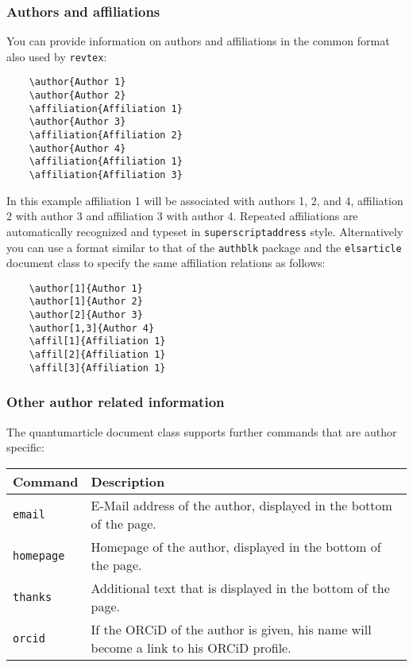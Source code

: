 \documentclass[a4paper,noarxiv,onecolumn]{quantumarticle}
\newenvironment{commands}
{\medskip\noindent\begin{longtable}{p{.20\columnwidth}p{.744\columnwidth}}
		\textsf{Command} & \textsf{Description} \\
		\midrule
	}
	{\bottomrule\end{longtable}}
\newcommand{\command}[2]{
	\small\texttt{#1} & {\small#2} \\
}
\begin{document}
	\subsubsection{Authors and affiliations}
	You can provide information on authors and affiliations in the common format also used by \texttt{revtex}:
	\begin{verbatim}
	\author{Author 1}
	\author{Author 2}
	\affiliation{Affiliation 1}
	\author{Author 3}
	\affiliation{Affiliation 2}
	\author{Author 4}
	\affiliation{Affiliation 1}
	\affiliation{Affiliation 3}
	\end{verbatim}
	In this example affiliation 1 will be associated with authors 1, 2, and 4, affiliation 2 with author 3 and affiliation 3 with author 4.
	Repeated affiliations are automatically recognized and typeset in \texttt{superscriptaddress} style.
	Alternatively you can use a format similar to that of the \texttt{authblk} package and the \texttt{elsarticle} document class to specify the same affiliation relations as follows:
	\begin{verbatim}
	\author[1]{Author 1}
	\author[1]{Author 2}
	\author[2]{Author 3}
	\author[1,3]{Author 4}
	\affil[1]{Affiliation 1}
	\affil[2]{Affiliation 1}
	\affil[3]{Affiliation 1}
	\end{verbatim}
	
	\subsubsection{Other author related information}
	The quantumarticle document class supports further commands that are author specific:
	\begin{commands}
		\command{email}{%
			E-Mail address of the author, displayed in the bottom of the page.
		}
	
		\command{homepage}{%
			Homepage of the author, displayed in the bottom of the page.
		}
	
		\command{thanks}{%
			Additional text that is displayed in the bottom of the page.
		}
	
		\command{orcid}{%
			If the ORCiD of the author is given, his name will become a link to his ORCiD profile.
		}
	\end{commands}
	
\end{document}
